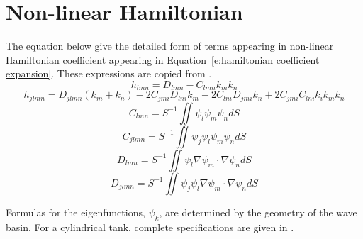 \section{Non-linear Hamiltonian}
\label{a:non-linear Hamiltonian}

The equation below give the detailed form of terms appearing in non-linear Hamiltonian coefficient appearing in Equation~\ref{e:hamiltonian coefficient expansion}. These expressions are copied from \citep{miles76:_nonlin}.
\begin{equation}
h_{lmn} = D_{lmn} - C_{lmn} k_m k_n
\end{equation}
\begin{equation}
h_{jlmn} = D_{jlmn} (k_m + k_n) - 2 C_{jmi} D_{lni} k_m - 2 C_{lni} D_{jmi} k_n + 2 C_{jmi} C_{lni} k_i k_m k_n
\end{equation}
\begin{equation}
C_{lmn} = S^{-1} \iint \psi_l \psi_m \psi_n dS
\end{equation}
\begin{equation}
C_{jlmn} = S^{-1} \iint \psi_j \psi_l \psi_m \psi_n dS
\end{equation}
\begin{equation}
D_{lmn} = S^{-1} \iint \psi_l \nabla \psi_m \cdot \nabla \psi_n dS
\end{equation}
\begin{equation}
D_{jlmn} = S^{-1} \iint \psi_j \psi_l \nabla \psi_m \cdot \nabla \psi_n dS
\end{equation}

Formulas for the eigenfunctions, $\psi_k$, are determined by the geometry of the wave basin. For a cylindrical tank, complete specifications are given in \citet{miles84:_inter}.

